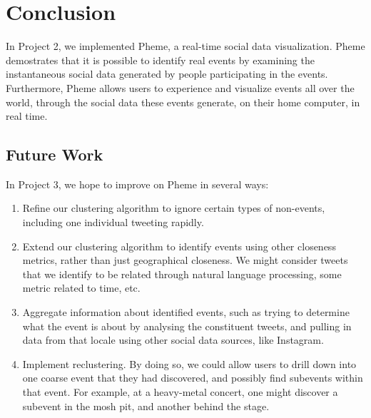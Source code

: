 \documentclass[pdftex,12pt,a4paper]{article}
\begin{document}
\section{Conclusion}
In Project 2, we implemented Pheme, a real-time social data visualization. Pheme demostrates that it is possible to identify real events by examining the instantaneous social data generated by people participating in the events. Furthermore, Pheme allows users to experience and visualize events all over the world, through the social data these events generate, on their home computer, in real time.

\subsection{Future Work}
In Project 3, we hope to improve on Pheme in several ways:
\begin{enumerate}
\item Refine our clustering algorithm to ignore certain types of non-events, including one individual tweeting rapidly. 
\item Extend our clustering algorithm to identify events using other closeness metrics, rather than just geographical closeness. We might consider tweets that we identify to be related through natural language processing, some metric related to time, etc.
\item Aggregate information about identified events, such as trying to determine what the event is about by analysing the constituent tweets, and pulling in data from that locale using other social data sources, like Instagram.
\item Implement reclustering. By doing so, we could allow users to drill down into one coarse event that they had discovered, and possibly find subevents within that event. For example, at a heavy-metal concert, one might discover a subevent in the mosh pit, and another behind the stage. 
\end{enumerate} 
\end{document}
